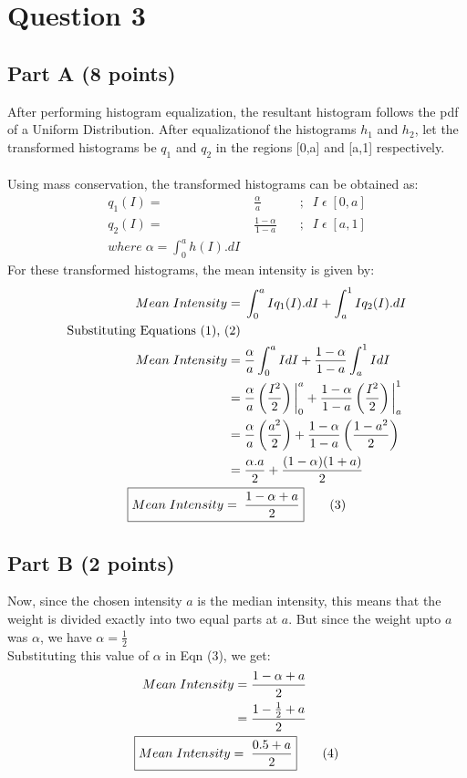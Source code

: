 \documentclass[12pt, a4paper]{article}
\begin{document}
\vspace*{-22pt}
\section*{Question 3}
\subsection*{Part A (8 points)}
\quad After performing histogram equalization, the resultant histogram follows the pdf of a Uniform Distribution. After equalizationof the histograms $h_1$ and $h_2$, let the transformed histograms be $q_1$ and $q_2$ in the regions [0,a] and [a,1] respectively. \\ \\
\null\quad Using mass conservation, the transformed histograms can be obtained as:
\begin{align*}
q_1(I) =&\; \frac{\alpha}{a} &\quad; \;\; I \; \epsilon \; [0,a] \tag{1}\\
q_2(I) =&\; \frac{1-\alpha}{1-a} &\quad; \;\; I \; \epsilon \; [a,1] \tag{2}\\
where \; \alpha = \int_0^ah(I).dI
\end{align*}
For these transformed histograms, the mean intensity is given by:
\begin{align*}
Mean\;Intensity =&\; \int_0^aIq_1(I).dI + \int_a^1Iq_2(I).dI \\
\text{Substituting Equations (1), (2)} \\
Mean\;Intensity =&\; \frac{\alpha}{a}\int_0^aIdI + \frac{1-\alpha}{1-a}\int_a^1IdI \\
=&\; \frac{\alpha}{a}\left(\frac{I^2}{2}\right)\bigg|_0^a + \frac{1-\alpha}{1-a}\left(\frac{I^2}{2}\right)\bigg|_a^1 \\
=&\; \frac{\alpha}{a}\left(\frac{a^2}{2}\right) + \frac{1-\alpha}{1-a}\left(\frac{1-a^2}{2}\right) \\
=&\; \frac{\alpha.a}{2} + \frac{(1-\alpha)(1+a)}{2} \\
\Aboxed{Mean\;Intensity =&\; \frac{1 - \alpha + a}{2}} \tag{3}\\
\end{align*}

\subsection*{Part B (2 points)}
\quad Now, since the chosen intensity $a$ is  the median intensity, this means that the weight is divided exactly into two equal parts at $a$. But since the weight upto $a$ was $\alpha$, we have $\alpha = \frac{1}{2}$ \\ 
\null\quad Substituting this value of $\alpha$ in Eqn (3), we get: 
\begin{align*}
Mean\;Intensity =&\; \frac{1 - \alpha + a}{2}\\
=&\; \frac{1 - \frac{1}{2} + a}{2}\\
\Aboxed{Mean\;Intensity =&\; \frac{0.5 + a}{2}} \tag{4}\\
\end{align*}
\end{document}
